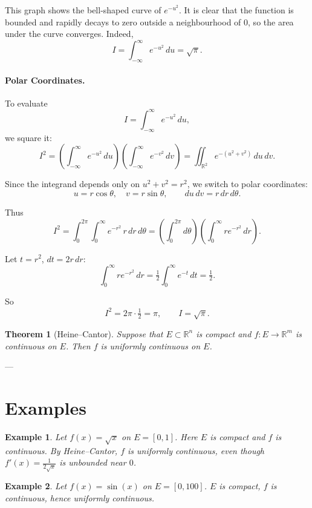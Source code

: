 \documentclass[11pt,a4paper]{article}
\newtheorem{theorem}{Theorem}
\newtheorem{example}{Example}
\begin{document}
This graph shows the bell-shaped curve of $e^{-u^2}$.  
It is clear that the function is bounded and rapidly decays to zero outside a neighbourhood of $0$, so the area under the curve converges.  
Indeed,
\[
I=\int_{-\infty}^{\infty} e^{-u^2}\,du = \sqrt{\pi}.
\]


\paragraph{Polar Coordinates.}
To evaluate
\[
I=\int_{-\infty}^{\infty} e^{-u^2}\,du,
\]
we square it:
\[
I^2=\left(\int_{-\infty}^{\infty} e^{-u^2}\,du\right)
\left(\int_{-\infty}^{\infty} e^{-v^2}\,dv\right)
=\iint_{\mathbb{R}^2} e^{-(u^2+v^2)}\,du\,dv.
\]

Since the integrand depends only on $u^2+v^2=r^2$, we switch to polar coordinates:
\[
u=r\cos\theta,\quad v=r\sin\theta, \qquad du\,dv = r\,dr\,d\theta.
\]

Thus
\[
I^2=\int_0^{2\pi}\int_0^\infty e^{-r^2}\,r\,dr\,d\theta
= \left(\int_0^{2\pi} d\theta\right)\left(\int_0^\infty r e^{-r^2}\,dr\right).
\]

Let $t=r^2$, $dt=2r\,dr$:
\[
\int_0^\infty r e^{-r^2}\,dr=\tfrac{1}{2}\int_0^\infty e^{-t}\,dt=\tfrac{1}{2}.
\]

So
\[
I^2=2\pi\cdot \tfrac{1}{2}=\pi,\qquad I=\sqrt{\pi}.
\]


	
	\begin{theorem}[Heine--Cantor]
		Suppose that $E \subset \mathbb{R}^n$ is compact and $f:E \to \mathbb{R}^m$ is continuous on $E$. 
		Then $f$ is uniformly continuous on $E$.
	\end{theorem}
	
	---
	
	\section*{Examples}
	
	\begin{example}
		Let $f(x) = \sqrt{x}$ on $E=[0,1]$.  
		Here $E$ is compact and $f$ is continuous.  
		By Heine--Cantor, $f$ is uniformly continuous, even though $f'(x)=\tfrac{1}{2\sqrt{x}}$ is unbounded near $0$.
	\end{example}
	
	\begin{example}
		Let $f(x) = \sin(x)$ on $E=[0,100]$.  
		$E$ is compact, $f$ is continuous, hence uniformly continuous.
	\end{example}
	
\end{document}

